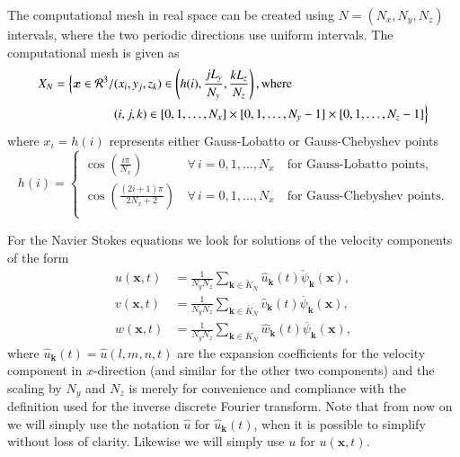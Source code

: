 \documentclass[preprint]{elsarticle}
\newcommand{\N}[1]{\check{#1}}
\newcommand{\D}[1]{\overline{#1}}
\begin{document}
The computational mesh in real space can be created using $N = (N_x, N_y, 
N_z)$ intervals, where the two periodic directions use uniform intervals. The 
computational mesh is given as
\begin{align}
  X_N = \Big\{ \bm{x} \in \mathcal{R}^3/&(x_i, y_j, z_k) \in \left( h(i), \frac{jL_y}{N_y}, \frac{kL_z}{N_z} \right), \text{where} \notag \\
  &(i, j, k) \in [0, 1, \ldots, N_x] \times [0, 1, \ldots, N_y-1] \times [0, 1, \ldots, N_z-1] \Big\} \label{eq:Xn}
\end{align}
where $x_i = h(i)$ represents either Gauss-Lobatto or Gauss-Chebyshev points
\begin{equation}
 h(i) = \begin{cases}
   \cos \left(\frac{i \pi }{N_x} \right) \, &\forall \, i=0,1, \ldots, N_x \quad  \text{for Gauss-Lobatto points}, \\
   \cos \left(\frac{(2i +1)\pi}{2N_x+2} \right) \, &\forall \, i=0,1, \ldots, N_x \quad  \text{for Gauss-Chebyshev points}. \\
 \end{cases}
\end{equation}

For the Navier Stokes equations we look for solutions of the velocity 
components of the form
\begin{align}
u(\bm{x}, t) &= \frac{1}{N_yN_z}\sum_{\bm{k} \in \N{K}_N} \hat{u}_{\bm{k}}(t) 
\N{\psi}_{\bm{k}}(\bm{x}), \label{eq:u_solx} \\
v(\bm{x}, t) &= \frac{1}{N_yN_z}\sum_{\bm{k} \in \D{K}_N} \hat{v}_{\bm{k}}(t) 
\D{\psi}_{\bm{k}}(\bm{x}), \label{eq:u_soly} \\
w(\bm{x}, t) &= \frac{1}{N_yN_z}\sum_{\bm{k} \in \D{K}_N} \hat{w}_{\bm{k}}(t) 
\D{\psi}_{\bm{k}}(\bm{x}), \label{eq:u_solz}
\end{align}
where $\hat{u}_{\bm{k}}(t) = \hat{u}(l, {m}, {n}, t)$ are the expansion 
coefficients for the velocity component in $x$-direction (and similar for the 
other two components) and the scaling by $N_y$ and $N_z$ is merely for 
convenience 
and compliance with the definition used for the inverse discrete Fourier 
transform. Note that from now on we will simply use the notation $\hat{u}$ for 
$\hat{u}_{\bm{k}}(t)$, when it is possible to simplify without loss of clarity. 
Likewise we will simply use $u$ for $u(\bm{x}, t)$. 
\end{document}
